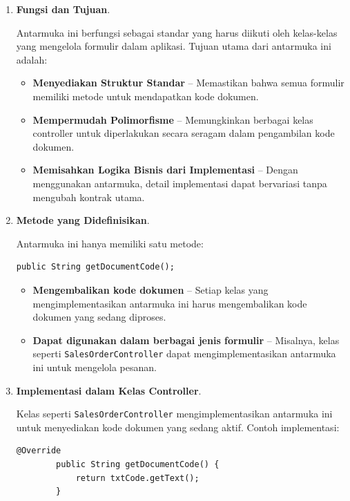 \begin{enumerate}
	\item \textbf{Fungsi dan Tujuan}.
	
	Antarmuka ini berfungsi sebagai standar yang harus diikuti oleh kelas-kelas yang mengelola formulir dalam aplikasi. Tujuan utama dari antarmuka ini adalah:
	
	\begin{itemize}
		\item \textbf{Menyediakan Struktur Standar} – Memastikan bahwa semua formulir memiliki metode untuk mendapatkan kode dokumen.
		\item \textbf{Mempermudah Polimorfisme} – Memungkinkan berbagai kelas controller untuk diperlakukan secara seragam dalam pengambilan kode dokumen.
		\item \textbf{Memisahkan Logika Bisnis dari Implementasi} – Dengan menggunakan antarmuka, detail implementasi dapat bervariasi tanpa mengubah kontrak utama.
	\end{itemize}
	
	\item \textbf{Metode yang Didefinisikan}.
	
	Antarmuka ini hanya memiliki satu metode:
	
	\begin{lstlisting}[style=JavaStyle]
		public String getDocumentCode();
	\end{lstlisting}
	
	\begin{itemize}
		\item \textbf{Mengembalikan kode dokumen} – Setiap kelas yang mengimplementasikan antarmuka ini harus mengembalikan kode dokumen yang sedang diproses.
		\item \textbf{Dapat digunakan dalam berbagai jenis formulir} – Misalnya, kelas seperti \texttt{SalesOrderController} dapat mengimplementasikan antarmuka ini untuk mengelola pesanan.
	\end{itemize}
	
	\item \textbf{Implementasi dalam Kelas Controller}.
	
	Kelas seperti \texttt{SalesOrderController} mengimplementasikan antarmuka ini untuk menyediakan kode dokumen yang sedang aktif. Contoh implementasi:
	
	\begin{lstlisting}[style=JavaStyle]
		@Override
		public String getDocumentCode() {
			return txtCode.getText();
		}
	\end{lstlisting}
	

\end{enumerate}
